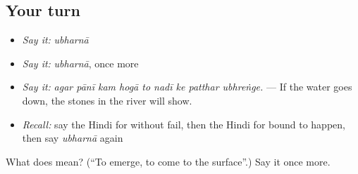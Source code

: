 \subsection*{Your turn}
\begin{itemize}
\raggedright
  \item \emph{Say it:} \emph{ubharnā}
  \item \emph{Say it:} \emph{ubharnā}, once more
  \item \emph{Say it:} \emph{agar pānī kam hogā to nadī ke patthar ubhreṅge.} — If the water goes down, the stones in the river will show.
  \item \emph{Recall:} say the Hindi for without fail, then the Hindi for bound to happen, then say \emph{ubharnā} again
\end{itemize}

\begin{tcolorbox}[breakable,colback=teal!4,colframe=teal!35!black,title={Before you move on}]
What does  mean? (\textquotedblleft{}To emerge, to come to the surface\textquotedblright{}.) Say it once more.
\end{tcolorbox}
